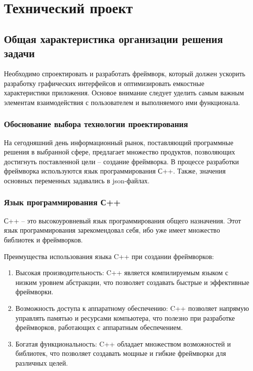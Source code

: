 \section{Технический проект}
\subsection{Общая характеристика организации решения задачи}

Необходимо спроектировать и разработать фреймворк, который должен ускорить разработку графических интерфейсов и оптимизировать емкостные характеристики приложения.
Основое внимание следует уделить самым важным элементам взаимодействия с пользователем и выполняемого ими функционала.

\subsubsection{Обоснование выбора технологии проектирования}

На сегодняшний день информационный рынок, поставляющий программные решения в выбранной сфере, предлагает множество продуктов, позволяющих достигнуть поставленной цели – создание фреймворка.
В процессе разработки фреймворка используются язык программирования С++. Также, значения основных переменных задавались в json-файлах.

\subsubsection{Язык программирования С++}

С++ – это высокоуровневый язык программирования общего назначения. Этот язык программирования зарекомендовал себя, ибо уже имеет множество библиотек и фреймворков.

Преимущества использования языка C++ при создании фреймворков:
\begin{enumerate}
\item Высокая производительность: C++ является компилируемым языком с низким уровнем абстракции, что позволяет создавать быстрые и эффективные фреймворки.
\item Возможность доступа к аппаратному обеспечению: C++ позволяет напрямую управлять памятью и ресурсами компьютера, что полезно при разработке фреймворков, работающих с аппаратным обеспечением.
\item Богатая функциональность: C++ обладает множеством возможностей и библиотек, что позволяет создавать мощные и гибкие фреймворки для различных целей.
\end{enumerate}

